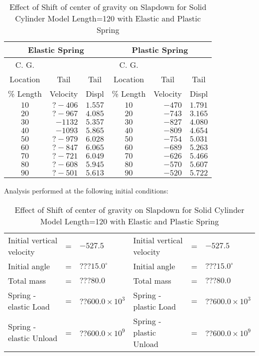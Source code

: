 \begin{table}
\begin{center}
\caption{Effect of Shift of center of gravity on Slapdown for Solid
Cylinder Model Length=120 with Elastic and Plastic Spring}
\makeqnum
\begin{tabular}{||c|r|r|c|r|r||}
\hline
\multicolumn{3}{||c|}{Elastic Spring} &\multicolumn{3}{c||}{Plastic
Spring}\\
\hline
\multicolumn{1}{||c|}{C. G.}
&  &
&\multicolumn{1}{c|}{C. G.}
& &\\
\multicolumn{1}{||c|}{Location}
&\multicolumn{1}{c|}{Tail}
&\multicolumn{1}{c|}{Tail}
&\multicolumn{1}{c|}{Location}
&\multicolumn{1}{c|}{Tail}
&\multicolumn{1}{c||}{Tail}\\
\multicolumn{1}{||c|}{\% Length}
&\multicolumn{1}{c|}{Velocity}
&\multicolumn{1}{c|}{Displ}
&\multicolumn{1}{c|}{\% Length}
&\multicolumn{1}{c|}{Velocity}
&\multicolumn{1}{c||}{Displ}\\
$10$ &$?-406$ &$1.557$ &$10$ &$-470$ &$1.791$\\
$20$ &$?-967$ &$4.085$ &$20$ &$-743$ &$3.165$\\
$30$ &$-1132$ &$5.357$ &$30$ &$-827$ &$4.080$\\
$40$ &$-1093$ &$5.865$ &$40$ &$-809$ &$4.654$\\
$50$ &$?-979$ &$6.028$ &$50$ &$-754$ &$5.031$\\
$60$ &$?-847$ &$6.065$ &$60$ &$-689$ &$5.263$\\
$70$ &$?-721$ &$6.049$ &$70$ &$-626$ &$5.466$\\
$80$ &$?-608$ &$5.945$ &$80$ &$-570$ &$5.607$\\
$90$ &$?-501$ &$5.613$ &$90$ &$-520$ &$5.722$\\
\hline
\end{tabular}
\end{center}

Analysis performed at the following initial conditions:

\makeqnum
\begin{tabular}{llllll}
Initial vertical velocity &= &$-527.5$
&Initial vertical velocity &= &$-527.5$\\
Initial angle &= &$???15.0^\circ$ &Initial angle &= &$???15.0^\circ$\\
Total mass &= &$???80.0$ &Total mass &= &$???80.0$\\
Spring - elastic     Load &=  &$??600.0\times10^3$
&Spring - plastic     Load &= &$??600.0\times10^3$\\
Spring - elastic   Unload &= &$??600.0\times10^9$
&Spring - plastic   Unload &= &$??600.0\times10^9$\\
\end{tabular}
\end{table}

